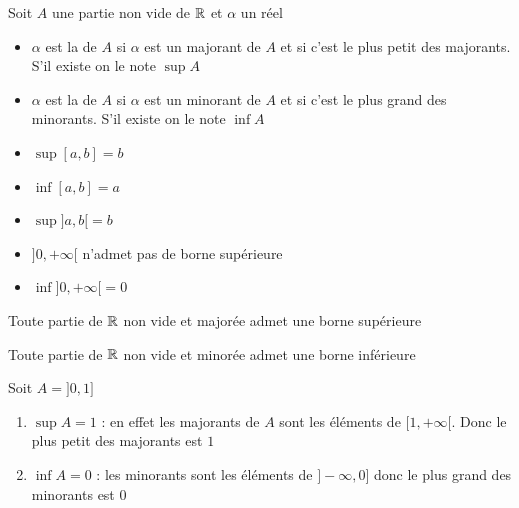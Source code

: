 \begin{frame}
\begin{mydefinition}
\label{def:sup-inf}
Soit $A$ une partie non vide de $\mathbb{R}$ et $\alpha$ un réel
\begin{itemize}
  \item $\alpha$ est la  de $A$ si $\alpha$ est un majorant de $A$ et
si c'est le plus petit des majorants. S'il existe on le note $\sup A$
\pause
  \item $\alpha$ est la  de $A$ si $\alpha$ est un minorant de
$A$ et si c'est le plus grand des minorants. S'il existe on le note $\inf A$
\end{itemize}
\end{mydefinition}

\pause

\begin{exemple}
\begin{itemize}
  \item $\sup[a,b]=b$
  \item $\inf[a,b]=a$
  \item $\sup]a,b[=b$
  \item $]0,+\infty[$ n'admet pas de borne supérieure
  \item $\inf ]0,+\infty[ =0$
\end{itemize}
\end{exemple}
\end{frame}

\begin{frame}

\begin{theoreme}[$\Rr4$]
Toute partie de $\mathbb{R}$ non vide et majorée admet une borne supérieure
\end{theoreme}

\pause

Toute partie de $\mathbb{R}$ non vide et minorée admet une borne inférieure

\pause
\bigskip

\begin{exemple}
Soit $A=]0,1]$
\pause
\begin{enumerate}
  \item $\sup A=1$ \pause : en effet les majorants de $A$ sont les éléments de $[1,+\infty[$. \pause Donc le plus petit des majorants est $1$
  \pause
  \item $\inf A=0$  \pause: les minorants sont les éléments de $]-\infty,0]$ \pause donc le plus grand des minorants est $0$
\end{enumerate}
\end{exemple}


\end{frame}


